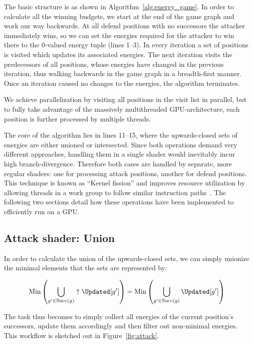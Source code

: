 The basic structure is as shown in Algorithm~\ref{alg:energy_game}.
In order to calculate all the winning budgets,
we start at the end of the game graph and work our way backwards.
At all defend positions with no successors the attacker immediately wins,
so we can set the energies required for the attacker to win there to the
0-valued energy tuple (lines 1--3).
In every iteration a set of positions is visited which updates its associated
energies.
The next iteration visits the predecessors of all positions, whose energies
have changed in the previous iteration, thus walking backwards in the game
graph in a breadth-first manner. Once an iteration caused no changes to the
energies, the algorithm terminates.

We achieve parallelization by visiting all positions in the visit list in
parallel, but to fully take advantage of the massively multithreaded
GPU-architecture, each position is further processed by multiple threads.

The core of the algorithm lies in lines 11--15, where the upwards-closed sets of
energies are either unioned or intersected.
Since both operations demand very different approaches,
handling them in a single shader would inevitably incur high branch-divergence.
Therefore both cases are handled by separate, more regular shaders:
one for processing attack positions, another for defend positions.
This technique is known as \enquote{Kernel fission}
and improves resource utilization by allowing threads in a work group to follow
similar instruction paths~\cite{Hijma2023}.
The following two sections detail how these operations have been implemented to
efficiently run on a GPU\@.


\subsection{Attack shader: Union}\label{subsec:attack_shader}

In order to calculate the union of the upwards-closed sets,
we can simply unionize the minimal elements that the sets are represented by:

\[\mathrm{Min} \left( \bigcup_{g' \in \mathrm{Succ}(g)} \uparrow \Updated[g'] \right) =
  \mathrm{Min} \left( \bigcup_{g' \in \mathrm{Succ}(g)}          \Updated[g'] \right)\]

The task thus becomes to simply
collect all energies of the current position's successors,
update them accordingly
and then filter out non-minimal energies.
This workflow is sketched out in Figure~\ref{fig:attack}.

